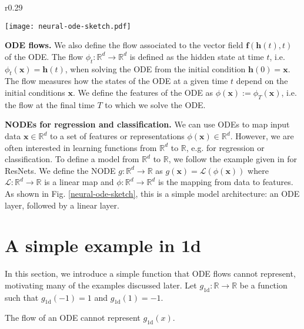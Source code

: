 \documentclass{article}
\begin{document}
\begin{wrapfigure}{r}{0.29\linewidth}
  \vspace{-20pt}
  \begin{center}
    \texttt{[image: neural-ode-sketch.pdf]}
  \end{center}
  \caption{Diagram of Neural ODE architecture.}
  \label{neural-ode-sketch}
  \vspace{-10pt}
\end{wrapfigure}

\textbf{ODE flows.} We also define the flow associated to the vector field $\mathbf{f}(\mathbf{h}(t), t)$ of the ODE. The flow $\phi_t : \mathbb{R}^d \to \mathbb{R}^d$ is defined as the hidden state at time $t$, i.e. $\phi_t(\mathbf{x}) = \mathbf{h}(t)$, when solving the ODE from the initial condition $\mathbf{h}(0) = \mathbf{x}$. The flow measures how the states of the ODE at a given time $t$ depend on the initial conditions $\mathbf{x}$. We define the features of the ODE as $\phi(\mathbf{x}) := \phi_T(\mathbf{x})$, i.e. the flow at the final time $T$ to which we solve the ODE.

\textbf{NODEs for regression and classification.} We can use ODEs to map input data $\mathbf{x} \in \mathbb{R}^d$ to a set of features or representations $\phi(\mathbf{x}) \in \mathbb{R}^d$. However, we are often interested in learning functions from $\mathbb{R}^d$ to $\mathbb{R}$, e.g. for regression or classification. To define a model from $\mathbb{R}^d$ to $\mathbb{R}$, we follow the example given in \cite{lin2018resnet} for ResNets. We define the NODE $g : \mathbb{R}^d \to \mathbb{R}$ as $g(\mathbf{x}) = \mathcal{L}(\phi(\mathbf{x}))$ where $\mathcal{L} : \mathbb{R}^d \to \mathbb{R}$ is a linear map and $\phi: \mathbb{R}^d \to \mathbb{R}^d$ is the mapping from data to features. As shown in Fig. \ref{neural-ode-sketch}, this is a simple model architecture: an ODE layer, followed by a linear layer.

\section{A simple example in 1d}

In this section, we introduce a simple function that ODE flows cannot represent, motivating many of the examples discussed later. Let $g_{1\text{d}} : \mathbb{R} \to \mathbb{R}$ be a function such that $g_{1\text{d}}(-1) = 1$ and $g_{1\text{d}}(1) = -1$.

\begin{prop}
The flow of an ODE cannot represent $g_{1\text{d}}(x)$.
\end{prop}
\end{document}
